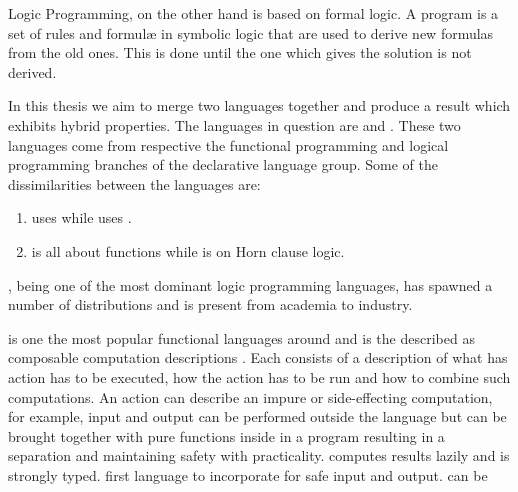 \documentclass[thesis-solanki.tex]{subfiles}
\begin{document}
Logic Programming, \cite{spivey1995introduction} on the other hand is based on formal logic.
A program is a set of rules and formul\ae{} in symbolic logic that are used to derive new formulas from the old
ones.
This is done until the one which gives the solution is not derived.


In this thesis we aim to merge two languages together and produce a result which exhibits hybrid properties.
%
The languages in question are  and .
These two languages come from respective the functional programming and logical programming branches of the
declarative language group.
Some of the dissimilarities between the languages are:
\begin{enumerate}
\item {}
  uses  while  uses
  . 
\item {} is all about functions while  is on Horn clause logic.
\end{enumerate} 

 \cite{wikiprolog}, being one of the most dominant logic programming
languages, has  
spawned a number of distributions and is present from academia to industry.  

 is one the most popular \cite{website:langpop} functional languages around and is the 
described as composable computation descriptions \cite{website:monadshaskellorg} . Each  consists of a 
description of what has action has to be executed, how the action has to be run and how to combine such 
computations. An action can describe an impure or side-effecting computation, for example, input and output can be 
performed outside the language but can be brought together with pure functions inside in a program resulting in a 
separation and maintaining safety with practicality.  computes results lazily and is strongly 
typed. 
first language to incorporate  \cite{wadler1992comprehending} for safe input and output.
can be 
\end{document}
